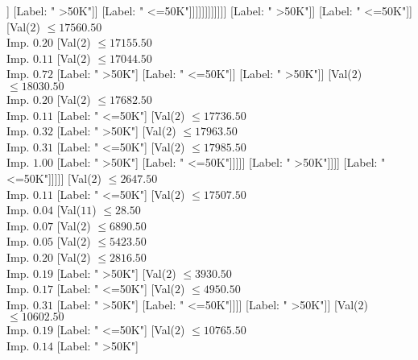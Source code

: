 \documentclass[margin=10pt]{standalone}
\begin{document}
\begin{forest}
																													[Label: " >50K"]
																													[Label: " <=50K"]]
																												[Label: " >50K"]]
																											[Label: " <=50K"]]]]]]]]]]]]
																[Label: " >50K"]]
															[Label: " <=50K"]]
														[Val($2$) $ \leq 17560.50$ \\ Imp. $0.20$
															[Val($2$) $ \leq 17155.50$ \\ Imp. $0.11$
																[Val($2$) $ \leq 17044.50$ \\ Imp. $0.72$
																	[Label: " >50K"]
																	[Label: " <=50K"]]
																[Label: " >50K"]]
															[Val($2$) $ \leq 18030.50$ \\ Imp. $0.20$
																[Val($2$) $ \leq 17682.50$ \\ Imp. $0.11$
																	[Label: " <=50K"]
																	[Val($2$) $ \leq 17736.50$ \\ Imp. $0.32$
																		[Label: " >50K"]
																		[Val($2$) $ \leq 17963.50$ \\ Imp. $0.31$
																			[Label: " <=50K"]
																			[Val($2$) $ \leq 17985.50$ \\ Imp. $1.00$
																				[Label: " >50K"]
																				[Label: " <=50K"]]]]]
																[Label: " >50K"]]]]
													[Label: " <=50K"]]]]]
									[Val($2$) $ \leq 2647.50$ \\ Imp. $0.11$
										[Label: " <=50K"]
										[Val($2$) $ \leq 17507.50$ \\ Imp. $0.04$
											[Val($11$) $ \leq 28.50$ \\ Imp. $0.07$
												[Val($2$) $ \leq 6890.50$ \\ Imp. $0.05$
													[Val($2$) $ \leq 5423.50$ \\ Imp. $0.20$
														[Val($2$) $ \leq 2816.50$ \\ Imp. $0.19$
															[Label: " >50K"]
															[Val($2$) $ \leq 3930.50$ \\ Imp. $0.17$
																[Label: " <=50K"]
																[Val($2$) $ \leq 4950.50$ \\ Imp. $0.31$
																	[Label: " >50K"]
																	[Label: " <=50K"]]]]
														[Label: " >50K"]]
													[Val($2$) $ \leq 10602.50$ \\ Imp. $0.19$
														[Label: " <=50K"]
														[Val($2$) $ \leq 10765.50$ \\ Imp. $0.14$
															[Label: " >50K"]

\end{forest}
\end{document}

